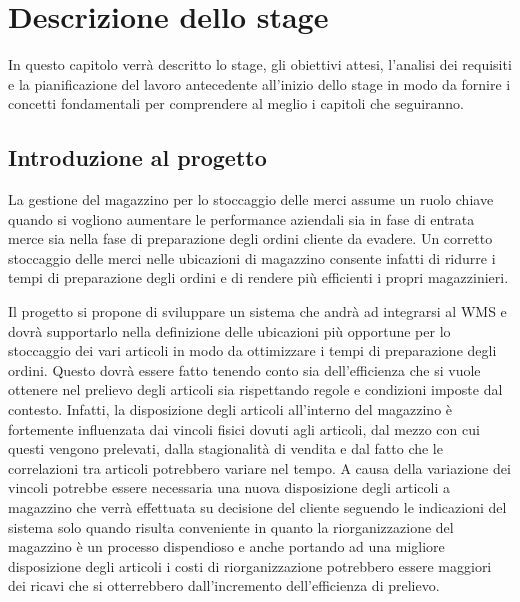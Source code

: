 \chapter{Descrizione dello stage}
\label{cap:descrizione-stage}

In questo capitolo verrà descritto lo stage, gli obiettivi attesi, l'analisi dei requisiti e la pianificazione del lavoro antecedente all'inizio dello stage in 
modo da fornire i concetti fondamentali per comprendere al meglio i capitoli che seguiranno.
\section{Introduzione al progetto}
La gestione del magazzino per lo stoccaggio delle merci assume un ruolo chiave quando si vogliono aumentare 
le performance aziendali sia in fase di entrata merce sia nella fase di preparazione degli ordini 
cliente da evadere. Un corretto stoccaggio delle merci nelle ubicazioni di magazzino consente infatti di ridurre i tempi di 
preparazione degli ordini e di rendere più efficienti i propri magazzinieri.

Il progetto si propone di sviluppare un sistema che andrà ad integrarsi al WMS e dovrà supportarlo nella definizione delle ubicazioni 
più opportune per lo stoccaggio dei vari articoli in modo da ottimizzare i tempi di preparazione degli ordini.
Questo dovrà essere fatto tenendo conto sia dell’efficienza che si vuole ottenere nel prelievo degli articoli sia rispettando regole e condizioni imposte dal contesto.
Infatti, la disposizione degli articoli all'interno del magazzino è fortemente influenzata dai vincoli fisici dovuti agli articoli, dal mezzo con cui questi vengono prelevati, dalla
stagionalità di vendita e dal fatto che le correlazioni tra articoli potrebbero variare nel tempo.
A causa della variazione dei vincoli potrebbe essere necessaria una nuova disposizione degli articoli a magazzino che verrà effettuata su 
decisione del cliente seguendo le indicazioni del sistema solo quando risulta conveniente in quanto la riorganizzazione del magazzino è un processo dispendioso e anche 
portando ad una migliore disposizione degli articoli i costi di riorganizzazione potrebbero essere maggiori dei ricavi che si otterrebbero dall'incremento dell'efficienza di prelievo.

